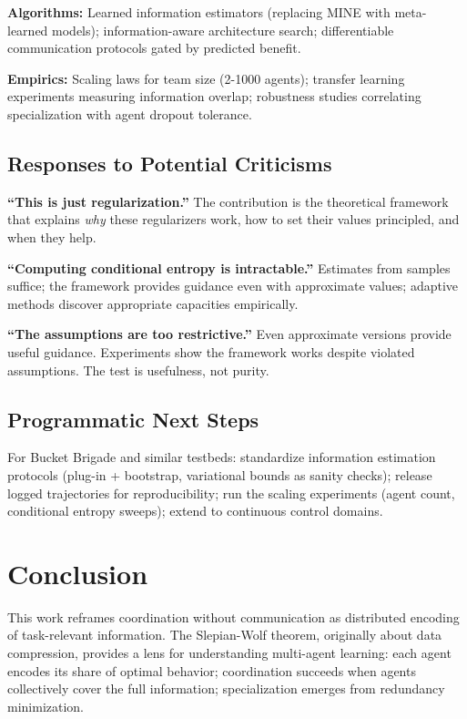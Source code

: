 \documentclass[10pt, letterpaper]{article}
\begin{document}
\textbf{Algorithms:} Learned information estimators (replacing MINE with meta-learned models); information-aware architecture search; differentiable communication protocols gated by predicted benefit.

\textbf{Empirics:} Scaling laws for team size (2-1000 agents); transfer learning experiments measuring information overlap; robustness studies correlating specialization with agent dropout tolerance.

\subsection{Responses to Potential Criticisms}

\textbf{``This is just regularization.''} The contribution is the theoretical framework that explains \emph{why} these regularizers work, how to set their values principled, and when they help.

\textbf{``Computing conditional entropy is intractable.''} Estimates from samples suffice; the framework provides guidance even with approximate values; adaptive methods discover appropriate capacities empirically.

\textbf{``The assumptions are too restrictive.''} Even approximate versions provide useful guidance. Experiments show the framework works despite violated assumptions. The test is usefulness, not purity.

\subsection{Programmatic Next Steps}

For Bucket Brigade and similar testbeds: standardize information estimation protocols (plug-in + bootstrap, variational bounds as sanity checks); release logged trajectories for reproducibility; run the scaling experiments (agent count, conditional entropy sweeps); extend to continuous control domains.

\section{Conclusion}
\label{sec:conclusion}

This work reframes coordination without communication as distributed encoding of task-relevant information. The Slepian-Wolf theorem, originally about data compression, provides a lens for understanding multi-agent learning: each agent encodes its share of optimal behavior; coordination succeeds when agents collectively cover the full information; specialization emerges from redundancy minimization.
\end{document}

